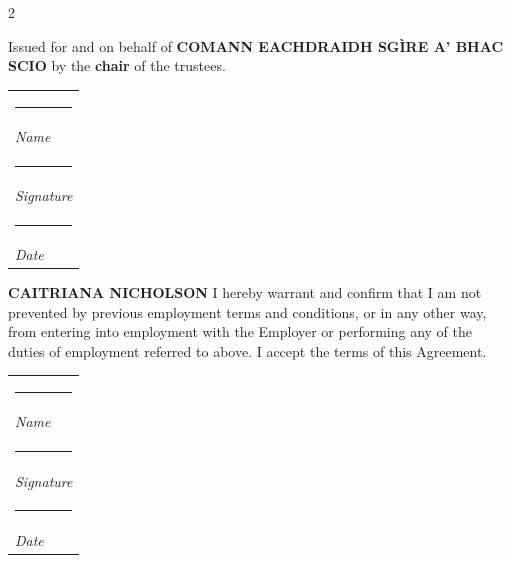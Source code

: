 \documentclass[a4paper,11pt,onecolumn ]{article}
\makeatletter
\newcommand{\namesigdate}[2][5cm]{%
  \begin{tabular}{@{}p{#1}@{}}
    #2 \\[2\normalbaselineskip] \hrule \\[0pt]
    {\small \textit{Name}} \\[2\normalbaselineskip] \hrule \\[0pt]
    {\small \textit{Signature}} \\[2\normalbaselineskip] \hrule \\[0pt]
    {\small \textit{Date}}
  \end{tabular}
}
\makeatother
\begin{document}
\begin{center}
    
\begin{multicols}{2}
\begin{center}
Issued for and on behalf of \textbf{COMANN EACHDRAIDH SGÌRE A' BHAC SCIO} by the
\textbf{chair} of the trustees.
\end{center}


\noindent
\namesigdate{}

\columnbreak

\begin{center}
\textbf{CAITRIANA NICHOLSON}
I hereby warrant and confirm that I am not prevented by previous employment terms
and conditions, or in any other way, from entering into employment with the Employer
or performing any of the duties of employment referred to above. I accept the terms of
this Agreement.
\end{center}

\noindent
\namesigdate{}


\end{multicols}

\end{center}
\end{document}
